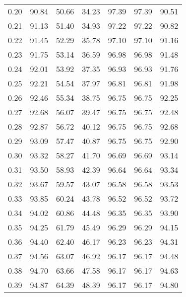 \begin{tabular}{|c|c|c|c|c|c|c|}
      0.20 &     90.84 &     50.66 &      34.23 &   97.39 &      97.39 &         90.51 \\
      0.21 &     91.13 &     51.40 &      34.93 &   97.22 &      97.22 &         90.82 \\
      0.22 &     91.45 &     52.29 &      35.78 &   97.10 &      97.10 &         91.16 \\
      0.23 &     91.75 &     53.14 &      36.59 &   96.98 &      96.98 &         91.48 \\
      0.24 &     92.01 &     53.92 &      37.35 &   96.93 &      96.93 &         91.76 \\
      0.25 &     92.21 &     54.54 &      37.97 &   96.81 &      96.81 &         91.98 \\
      0.26 &     92.46 &     55.34 &      38.75 &   96.75 &      96.75 &         92.25 \\
      0.27 &     92.68 &     56.07 &      39.47 &   96.75 &      96.75 &         92.48 \\
      0.28 &     92.87 &     56.72 &      40.12 &   96.75 &      96.75 &         92.68 \\
      0.29 &     93.09 &     57.47 &      40.87 &   96.75 &      96.75 &         92.90 \\
      0.30 &     93.32 &     58.27 &      41.70 &   96.69 &      96.69 &         93.14 \\
      0.31 &     93.50 &     58.93 &      42.39 &   96.64 &      96.64 &         93.34 \\
      0.32 &     93.67 &     59.57 &      43.07 &   96.58 &      96.58 &         93.53 \\
      0.33 &     93.85 &     60.24 &      43.78 &   96.52 &      96.52 &         93.72 \\
      0.34 &     94.02 &     60.86 &      44.48 &   96.35 &      96.35 &         93.90 \\
      0.35 &     94.25 &     61.79 &      45.49 &   96.29 &      96.29 &         94.15 \\
      0.36 &     94.40 &     62.40 &      46.17 &   96.23 &      96.23 &         94.31 \\
      0.37 &     94.56 &     63.07 &      46.92 &   96.17 &      96.17 &         94.48 \\
      0.38 &     94.70 &     63.66 &      47.58 &   96.17 &      96.17 &         94.63 \\
      0.39 &     94.87 &     64.39 &      48.39 &   96.17 &      96.17 &         94.80 \\

\end{tabular}
